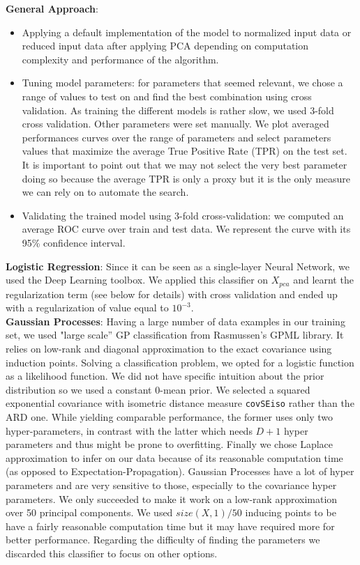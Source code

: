 \documentclass[10pt,a4paper]{article}
\begin{document}
  \textbf{General Approach}:
   	\begin{itemize}
	   	\item Applying a default implementation of the model to normalized input data or reduced input data after applying PCA depending on computation complexity and performance of the algorithm.
    		\item Tuning model parameters: for parameters that seemed relevant, we chose a range of values to test on and find the best combination using cross validation. As training the different models is rather slow, we used 3-fold cross validation. Other parameters were set manually. We plot averaged performances curves over the range of parameters and select parameters values that maximize the average True Positive Rate (TPR) on the test set. It is important to point out that we may not select the very best parameter doing so because the average TPR is only a proxy but it is the only measure we can rely on to automate the search.
		  \item Validating the trained model using 3-fold cross-validation: we computed an average ROC curve over train and test data. We represent the curve with its 95\% confidence interval.
	\end{itemize}

  \textbf{Logistic Regression}: Since it can be seen as a single-layer Neural Network, we used the Deep Learning toolbox. We applied this classifier on $X_{pca}$ and learnt the regularization term (see below for details) with cross validation and ended up with a regularization of value equal to $10^{-3}$.\\

  \textbf{Gaussian Processes}: Having a large number of data examples in our training set, we used "large scale'' GP classification from Rasmussen's GPML library. It relies on low-rank and diagonal approximation to the exact covariance using induction points. Solving a classification problem, we opted for a logistic function as a likelihood function. We did not have specific intuition about the prior distribution so we used a constant 0-mean prior. We selected a squared exponential covariance with isometric distance measure \texttt{covSEiso} rather than the ARD one. While yielding comparable performance, the former uses only two hyper-parameters, in contrast with the latter which needs $D+1$ hyper parameters and thus might be prone to overfitting. Finally we chose Laplace approximation to infer on our data because of its reasonable computation time (as opposed to Expectation-Propagation). Gaussian Processes have a lot of hyper parameters and are very sensitive to those, especially to the covariance hyper parameters. We only succeeded to make it work on a low-rank approximation over 50 principal components. We used $size(X,1) / 50$ inducing points to be have a fairly reasonable computation time but it may have required more for better performance. Regarding the difficulty of finding the parameters we discarded this classifier to focus on other options.\\
\end{document}
